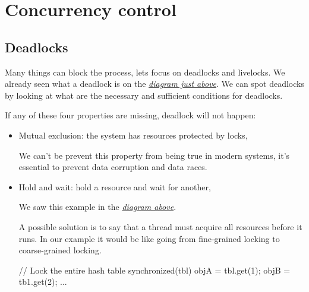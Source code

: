 \section{Concurrency control}
\subsection{Deadlocks}
Many things can block the process, lets focus on deadlocks and livelocks. We already seen what a deadlock is on the \hyperlink{lock}{\textit{diagram just above}}. We can spot deadlocks by looking at what are the necessary and sufficient conditions for deadlocks.
    \begin{tcolorbox}[gris]
        If any of these four properties are missing, deadlock will not happen:
        \begin{itemize}[left=10pt, label=\textbullet]
            \item Mutual exclusion: the system has resources protected by locks, 

                We can't be prevent this property from being true in modern systems, it's essential to prevent data corruption and data races.
            \item Hold and wait: hold a resource and wait for another,

                \begin{image}{
                        We saw this example in the \hyperlink{lock}{\textit{diagram above}}.
                    }
                    \begin{codeCenter}
                    \begin{Ccode}
objA = tbl.get(1);
objB = tb1.get(2);
synchronized(objA){
    synchronized(objB){
        ...
                    \end{Ccode}
                    \end{codeCenter}
                \end{image}
                \begin{image}{A possible solution is to say that a thread must acquire all resources before it runs. In our example it would be like going from fine-grained locking to coarse-grained locking.}
                    \begin{codeCenter}
                    \begin{Ccode}
// Lock the entire hash table
synchronized(tbl) { 
    objA = tbl.get(1);
    objB = tb1.get(2);
    ...
}
                    \end{Ccode}
                    \end{codeCenter}
                    

\end{image}
\end{itemize}
\end{tcolorbox}
